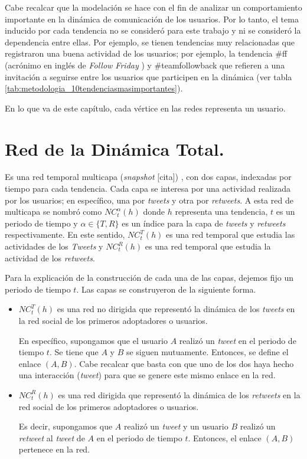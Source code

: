 \documentclass[../main.tex]{subfiles}
\begin{document}
Cabe recalcar que la modelación se hace con el fin de analizar un comportamiento importante en la dinámica de comunicación de los usuarios. Por lo tanto, el tema inducido por cada tendencia no se consideró para este trabajo y ni se consideró la dependencia entre ellas. Por ejemplo, se tienen tendencias muy relacionadas que registraron una buena actividad de los usuarios; por ejemplo, la tendencia \#ff (acrónimo en inglés de \textit{Follow Friday} ) y \#teamfollowback que refieren a una invitación a seguirse entre los usuarios que participen en la dinámica (ver tabla \ref{tab:metodologia_10tendenciasmasimportantes}).

En lo que va de este capítulo, cada vértice en las redes representa un usuario.

\section{Red de la Dinámica Total.}

Es una red temporal multicapa (\textit{snapshot} [cita]) , con dos capas, indexadas por tiempo para cada tendencia. Cada capa se interesa por una actividad realizada por los usuarios; en específico, una por \textit{tweets} y otra por \textit{retweets}.  A esta red de multicapa se nombró como $NC^{\alpha}_{t} (h) $ donde $h$ representa una tendencia, $t$ es un periodo de tiempo y $\alpha \in \{T, R\}$ es un índice para la capa de \textit{tweets} y \textit{retweets} respectivamente. En este sentido, $NC^{T}_{t} (h) $ es una red temporal que estudia las actividades de los \textit{Tweets} y $NC^{R}_{t} (h) $ es una red temporal que estudia la actividad de los \textit{retweets}.

Para la explicación de la construcción de cada una de las capas, dejemos fijo un periodo de tiempo $t$.
Las capas se construyeron de la siguiente forma.

\begin{itemize}
    \item $NC^{T}_{t}(h)$ es una red no dirigida que representó la dinámica de los \textit{tweets} en la red social de los primeros adoptadores o usuarios.

    En específico, supongamos que el usuario $A$ realizó un \textit{tweet} en el periodo de tiempo $t$. Se tiene que $A$ y $B$ se siguen mutuamente. Entonces, se define el enlace $(A,B)$. Cabe recalcar que basta con que uno de los dos haya hecho una interacción (\textit{tweet}) para que se genere este mismo enlace en la red.

    \item $NC^{R}_{t}(h)$ es una red dirigida que representó la dinámica de los \textit{retweets} en la red social de los primeros adoptadores o usuarios.

    Es decir, supongamos que $A$ realizó un \textit{tweet} y  un usuario $B$ realizó un \textit{retweet} al \textit{tweet} de $A$ en el periodo de tiempo $t$. Entonces, el enlace $(A,B)$ pertenece en la red.
\end{itemize}
\end{document}
